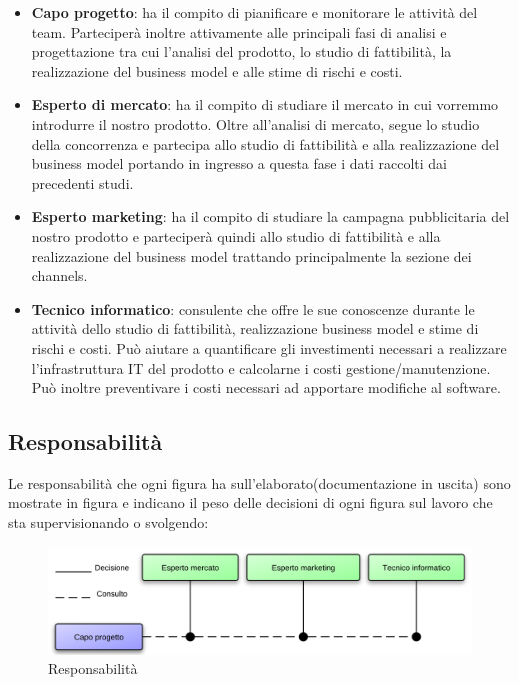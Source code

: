 \vspace*{0.5cm}

\begin{itemize}

\item \textbf{Capo progetto}: ha il compito di pianificare e monitorare le attività del team. Parteciperà inoltre attivamente alle principali fasi di analisi e progettazione tra cui l'analisi del prodotto, lo studio di fattibilità, la realizzazione del business model e alle stime di rischi e costi.

\item \textbf{Esperto di mercato}: ha il compito di studiare il mercato in cui vorremmo introdurre il nostro prodotto. Oltre all'analisi di mercato, segue lo studio della concorrenza e partecipa allo studio di fattibilità e alla realizzazione del business model portando in ingresso a questa fase i dati raccolti dai precedenti studi. 

\item \textbf{Esperto marketing}: ha il compito di studiare la campagna pubblicitaria del nostro prodotto e parteciperà quindi allo studio di fattibilità e alla realizzazione del business model trattando principalmente la sezione dei channels.

\item \textbf{Tecnico informatico}: consulente che offre le sue conoscenze durante le attività dello studio di fattibilità, realizzazione business model e stime di rischi e costi. Può aiutare a quantificare gli investimenti necessari a realizzare l'infrastruttura IT del prodotto e calcolarne i costi gestione/manutenzione. Può inoltre preventivare i costi necessari ad apportare modifiche al software.

\end{itemize}

\subsection{Responsabilità}
Le responsabilità che ogni figura ha sull'elaborato(documentazione in uscita) sono mostrate in figura  e indicano il peso delle decisioni di ogni figura sul lavoro che sta supervisionando o svolgendo:

\vspace*{0.5cm}

\begin{figure}[H]
\centering
\includegraphics[scale=0.8]{images/cap3/resp.png}
\caption{Responsabilità}
\end{figure}

